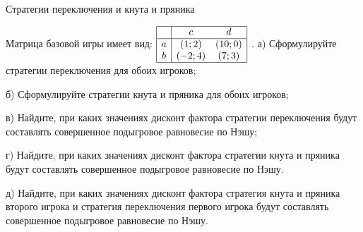 \begin{problem}
 Стратегии переключения и кнута и пряника

Матрица базовой игры имеет вид:  $\begin{array}{|c|cc|}  \hline {} & {c} & {d} \\  \hline {a} & {\left(1;2\right)} & {\left(10;0\right)} \\ {b} & {\left(-2;4\right)} & {\left(7;3\right)} \\  \hline  \end{array}$ .
а) Сформулируйте стратегии переключения для обоих игроков;\par
б) Сформулируйте стратегии кнута и пряника для обоих игроков;\par
в) Найдите, при каких значениях дисконт фактора стратегии переключения будут составлять совершенное подыгровое равновесие по Нэшу;\par
г) Найдите, при каких значениях дисконт фактора стратегии кнута и пряника будут составлять совершенное подыгровое равновесие по Нэшу.\par
д) Найдите, при каких значениях дисконт фактора стратегия кнута и пряника второго игрока и стратегия переключения первого игрока будут составлять совершенное подыгровое равновесие по Нэшу.



\begin{sol}

\end{sol}
\end{problem}




